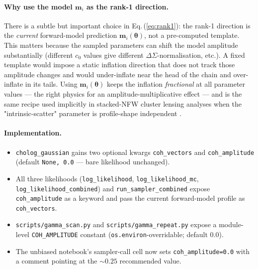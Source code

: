 \documentclass[11pt,a4paper]{article}
\newcommand{\dsig}{\Delta\Sigma}
\begin{document}
\paragraph{Why use the model $\mathbf{m}_i$ as the rank-1 direction.}
There is a subtle but important choice in Eq.\,(\ref{eq:rank1}): the
rank-1 direction is the \emph{current} forward-model prediction
$\mathbf{m}_i(\boldsymbol\theta)$, not a pre-computed template.  This
matters because the sampled parameters can shift the model amplitude
substantially (different $c_0$ values give different
$\dsig$-normalisation, etc.).  A fixed template would impose a static
inflation direction that does not track those amplitude changes and would
under-inflate near the head of the chain and over-inflate in its tails.
Using $\mathbf{m}_i(\boldsymbol\theta)$ keeps the inflation
\emph{fractional} at all parameter values — the right physics for an
amplitude-multiplicative effect — and is the same recipe used implicitly
in stacked-NFW cluster lensing analyses when the "intrinsic-scatter"
parameter is profile-shape independent \citep{McClintock2018,McClintock2019}.

\paragraph{Implementation.}
\begin{itemize}[noitemsep]
  \item \texttt{cholog\_gaussian} gains two optional kwargs
        \texttt{coh\_vectors} and \texttt{coh\_amplitude} (default
        \texttt{None, 0.0} — bare likelihood unchanged).
  \item All three likelihoods (\texttt{log\_likelihood},
        \texttt{log\_likelihood\_mc}, \texttt{log\_likelihood\_combined})
        and \texttt{run\_sampler\_combined} expose
        \texttt{coh\_amplitude} as a keyword and pass the current
        forward-model profile as \texttt{coh\_vectors}.
  \item \texttt{scripts/gamma\_scan.py} and \texttt{scripts/gamma\_repeat.py}
        expose a module-level \texttt{COH\_AMPLITUDE} constant
        (\texttt{os.environ}-overridable; default $0.0$).
  \item The unbiased notebook's sampler-call cell now sets
        \texttt{coh\_amplitude=0.0} with a comment pointing at the
        $\sim\!0.25$ recommended value.
\end{itemize}
\end{document}
